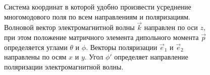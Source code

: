 \begin{figure}
\centering



\caption{Система координат в которой удобно произвести усреднение
  многомодового поля по всем направлениям и поляризациям. Волновой
  вектор электромагнитной волны $\vec{k}$ направлен по оси $z$, при
  этом положение матричного элемента дипольного момента $\vec{p}$
  определяется углами $\theta$ и $\phi$. Векторы поляризации $\vec{e}_1$ и $\vec{e}_2$
направлены по осям $x$ и $y$. Угол $\phi'$ определяет направление
поляризации электромагнитной волны.}
\label{figPart1Ch2_6}
\end{figure}
